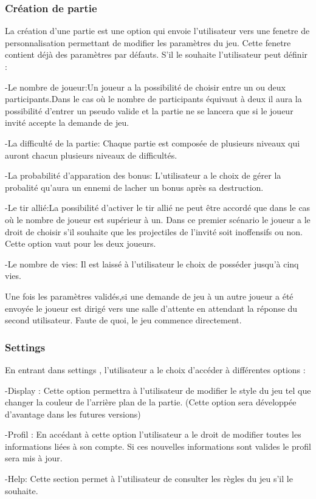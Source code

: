 \documentclass[utf8]{article}
\begin{document}
\subsubsection{Création de partie}
La création d'une partie est une option qui envoie l'utilisateur vers une fenetre de personnalisation permettant de modifier les paramètres du jeu.
Cette fenetre contient déjà des paramètres par défauts.
S'il le souhaite l'utilisateur peut définir :
\begin{itemsize}
\par
\item-Le nombre de joueur:Un joueur a la possibilité de choisir entre un ou deux participants.Dans le cas où le nombre de participants équivaut à deux il aura la possibilité d'entrer un pseudo valide et la partie ne se lancera que si le joueur invité accepte la demande de jeu.
\item-La difficulté de la partie: Chaque partie est composée de plusieurs niveaux qui auront chacun plusieurs niveaux de difficultés.
\item-La probabilité d'apparation des bonus: L'utilisateur a le choix de gérer la probalité qu'aura un ennemi de lacher un bonus après sa destruction.
\item-Le tir allié:La possibilité d'activer le tir allié ne peut être accordé que dans le cas où le nombre de joueur est supérieur à un.
Dans ce premier scénario le joueur a le droit de choisir s'il souhaite que les projectiles de l'invité soit inoffensifs ou non. Cette option vaut pour les deux joueurs.
\item-Le nombre de vies: Il est laissé à l'utilisateur le choix de posséder jusqu'à cinq vies.
\end{itemsize}

Une fois les paramètres validés,si une demande de jeu à un autre joueur a été envoyée le joueur est dirigé vers une salle d'attente en attendant la réponse du second utilisateur. Faute de quoi, le jeu commence directement.


\subsubsection{Settings}
En entrant dans settings , l'utilisateur a le choix d'accéder à différentes options :
\item-Display : Cette option permettra à l'utilisateur de modifier le style du jeu tel que changer la couleur de l'arrière plan de la partie. (Cette option sera développée d'avantage dans les futures versions)
\item-Profil : En accédant à cette option l'utilisateur a le droit de modifier toutes les informations liées à son compte. Si ces nouvelles informations sont valides le profil sera mis à jour.
\item-Help: Cette section permet à l'utilisateur de consulter les règles du jeu s'il le souhaite.
\end{document}
